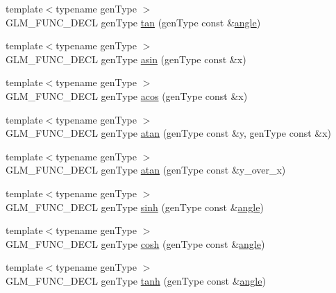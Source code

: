 \begin{DoxyCompactItemize}
\item 
{\footnotesize template$<$typename gen\+Type $>$ }\\G\+L\+M\+\_\+\+F\+U\+N\+C\+\_\+\+D\+E\+CL gen\+Type \hyperlink{group__core__func__trigonometric_ga328aeb0de4f312dc3d200cb929715d44}{tan} (gen\+Type const \&\hyperlink{group__gtc__quaternion_ga23a3fc7ada5bbb665ff84c92c6e0542c}{angle})
\item 
{\footnotesize template$<$typename gen\+Type $>$ }\\G\+L\+M\+\_\+\+F\+U\+N\+C\+\_\+\+D\+E\+CL gen\+Type \hyperlink{group__core__func__trigonometric_gafca5e8c71ea06be0840227b4aafc5680}{asin} (gen\+Type const \&x)
\item 
{\footnotesize template$<$typename gen\+Type $>$ }\\G\+L\+M\+\_\+\+F\+U\+N\+C\+\_\+\+D\+E\+CL gen\+Type \hyperlink{group__core__func__trigonometric_gac85497ed2e39d4cac4ac32bed4dfc506}{acos} (gen\+Type const \&x)
\item 
{\footnotesize template$<$typename gen\+Type $>$ }\\G\+L\+M\+\_\+\+F\+U\+N\+C\+\_\+\+D\+E\+CL gen\+Type \hyperlink{group__core__func__trigonometric_gabf80ac0817d1db032dd6a0969aa2b84a}{atan} (gen\+Type const \&y, gen\+Type const \&x)
\item 
{\footnotesize template$<$typename gen\+Type $>$ }\\G\+L\+M\+\_\+\+F\+U\+N\+C\+\_\+\+D\+E\+CL gen\+Type \hyperlink{group__core__func__trigonometric_gaa7be96f0c12a40eeac5c7f04a3d465a1}{atan} (gen\+Type const \&y\+\_\+over\+\_\+x)
\item 
{\footnotesize template$<$typename gen\+Type $>$ }\\G\+L\+M\+\_\+\+F\+U\+N\+C\+\_\+\+D\+E\+CL gen\+Type \hyperlink{group__core__func__trigonometric_ga2e8c9a896e803661058de83429aa6eda}{sinh} (gen\+Type const \&\hyperlink{group__gtc__quaternion_ga23a3fc7ada5bbb665ff84c92c6e0542c}{angle})
\item 
{\footnotesize template$<$typename gen\+Type $>$ }\\G\+L\+M\+\_\+\+F\+U\+N\+C\+\_\+\+D\+E\+CL gen\+Type \hyperlink{group__core__func__trigonometric_gaa7685634f6e920ba9a683e5ec7aed976}{cosh} (gen\+Type const \&\hyperlink{group__gtc__quaternion_ga23a3fc7ada5bbb665ff84c92c6e0542c}{angle})
\item 
{\footnotesize template$<$typename gen\+Type $>$ }\\G\+L\+M\+\_\+\+F\+U\+N\+C\+\_\+\+D\+E\+CL gen\+Type \hyperlink{group__core__func__trigonometric_ga941f20e5315113d1a2e037f073a62f04}{tanh} (gen\+Type const \&\hyperlink{group__gtc__quaternion_ga23a3fc7ada5bbb665ff84c92c6e0542c}{angle})

\end{DoxyCompactItemize}
